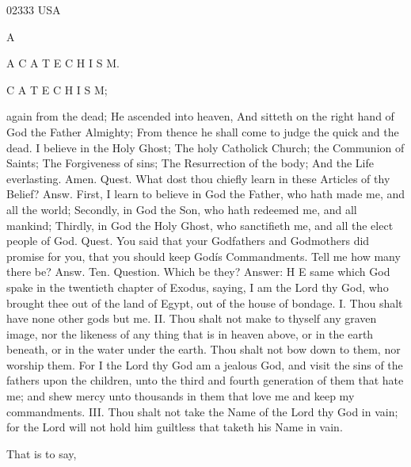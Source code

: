 02333 USA

A

A C A T E C H I S M.

C A T E C H I S M;

again from the dead; He ascended into heaven, And sitteth on the right hand of God the Father Almighty; From thence he shall come to judge the quick and the dead. I believe in the Holy Ghost; The holy Catholick Church; the Communion of Saints; The Forgiveness of sins; The Resurrection of the body; And the Life everlasting. Amen. Quest. What dost thou chiefly learn in these Articles of thy Belief? Answ. First, I learn to believe in God the Father, who hath made me, and all the world; Secondly, in God the Son, who hath redeemed me, and all mankind; Thirdly, in God the Holy Ghost, who sanctifieth me, and all the elect people of God. Quest. You said that your Godfathers and Godmothers did promise for you, that you should keep Godís Commandments. Tell me how many there be? Answ. Ten. Question. Which be they? Answer: H E same which God spake in the twentieth chapter of Exodus, saying, I am the Lord thy God, who brought thee out of the land of Egypt, out of the house of bondage. I. Thou shalt have none other gods but me. II. Thou shalt not make to thyself any graven image, nor the likeness of any thing that is in heaven above, or in the earth beneath, or in the water under the earth. Thou shalt not bow down to them, nor worship them. For I the Lord thy God am a jealous God, and visit the sins of the fathers upon the children, unto the third and fourth generation of them that hate me; and shew mercy unto thousands in them that love me and keep my commandments. III. Thou shalt not take the Name of the Lord thy God in vain; for the Lord will not hold him guiltless that taketh his Name in vain.

That is to say,

